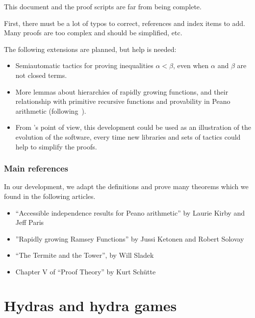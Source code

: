 This document and the proof scripts are far from being complete.

First, there must be a lot of typos to correct, references and index items to add. Many proofs are too complex and should be simplified, etc.

The following extensions are planned, but help is needed:

\begin{itemize}
\item Semiautomatic tactics for proving inequalities $\alpha < \beta$, even when $\alpha$ and $\beta$ are not closed terms.
\item More lemmas about hierarchies of rapidly growing
  functions, and their relationship 
    with primitive recursive functions and provability in Peano arithmetic 
(following~\cite{KS81, KP82}).
\item From \coq's point of view, this development could be used as an illustration of the evolution of the software, every time new libraries and sets of tactics could help to simplify the proofs.
\end{itemize}

\subsection*{Main references}

In our development, we adapt the definitions and prove many theorems which
we found in the following articles. 
\begin{itemize}
\item ``Accessible independence results for Peano arithmetic''  by Laurie Kirby and Jeff Paris~\cite{KP82}
\item ''Rapidly growing Ramsey Functions'' by Jussi Ketonen and Robert Solovay~\cite{KS81}
\item ``The Termite and the Tower'', by Will Sladek~\cite{Sladek07thetermite}
\item Chapter V of ``Proof Theory'' by Kurt Schütte~\cite{schutte}
\end{itemize}






\chapter{Hydras and hydra games}

\label{sec:orgheadline91}
\label{chapter:hydras}




